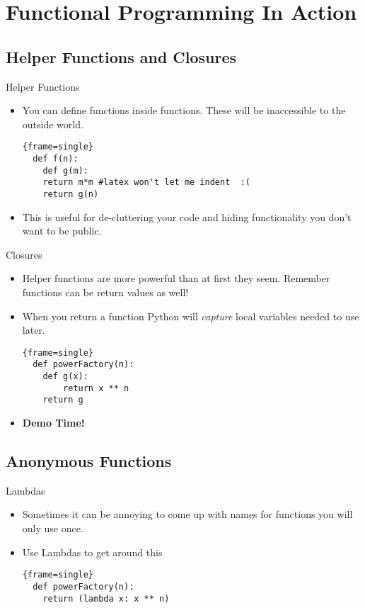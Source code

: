 \documentclass{beamer}
\begin{document}
\section{Functional Programming In Action}
\subsection{Helper Functions and Closures}
\begin{frame}[fragile]{Helper Functions}
	\begin{itemize}
	\item { You can define functions inside functions. These will be inaccessible to the outside world.
  \begin{block}{}
  \begin{lstlisting}{frame=single}
  def f(n):
  	def g(m):
	return m*m #latex won't let me indent  :(
  	return g(n)
  \end{lstlisting}
\end{block}
	}
\item{ This is useful for de-cluttering your code and hiding functionality you don't want to be public.} 
	\end{itemize}
\end{frame}
\begin{frame}[fragile]{Closures}
	\begin{itemize}
	\item { Helper functions are more powerful than at first they seem. Remember functions can be return values as well!
	}
	\pause
	\item { When you return a function Python will \emph{capture} local variables needed to use later.
  \begin{block}{}
  \begin{lstlisting}{frame=single}
  def powerFactory(n):
  	def g(x):
		return x ** n
  	return g
  \end{lstlisting}
\end{block}
}
\pause
\item{
\large{\textbf{ Demo Time!}}
}
\end{itemize}
\end{frame}
\subsection{Anonymous Functions}
\begin{frame}[fragile]{Lambdas}
	\begin{itemize}
	\item { Sometimes it can be annoying to come up with names for functions you will only use once.
	} 
	\pause
	\item{Use Lambdas to get around this 
  \begin{block}{}
  \begin{lstlisting}{frame=single}
  def powerFactory(n):
  	return (lambda x: x ** n) 
  \end{lstlisting}
\end{block}
}
	\end{itemize}
\end{frame}
\end{document}
